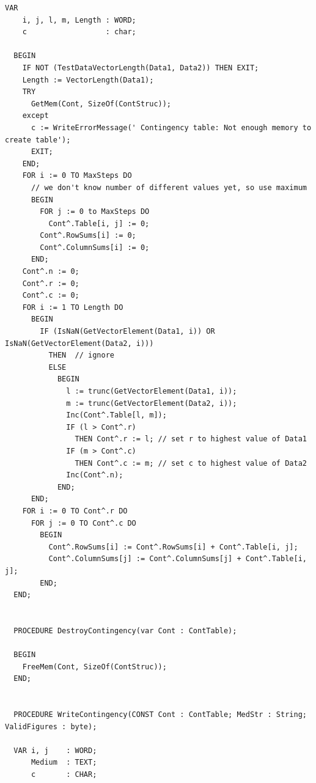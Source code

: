 \begin{refsection}
\begin{lstlisting}[caption=Handling of contingency tables]
  VAR
    i, j, l, m, Length : WORD;
    c                  : char;

  BEGIN
    IF NOT (TestDataVectorLength(Data1, Data2)) THEN EXIT;
    Length := VectorLength(Data1);
    TRY
      GetMem(Cont, SizeOf(ContStruc));
    except
      c := WriteErrorMessage(' Contingency table: Not enough memory to create table');
      EXIT;
    END;
    FOR i := 0 TO MaxSteps DO
      // we don't know number of different values yet, so use maximum
      BEGIN
        FOR j := 0 to MaxSteps DO
          Cont^.Table[i, j] := 0;
        Cont^.RowSums[i] := 0;
        Cont^.ColumnSums[i] := 0;
      END;
    Cont^.n := 0;
    Cont^.r := 0;
    Cont^.c := 0;
    FOR i := 1 TO Length DO
      BEGIN
        IF (IsNaN(GetVectorElement(Data1, i)) OR IsNaN(GetVectorElement(Data2, i)))
          THEN  // ignore
          ELSE
            BEGIN
              l := trunc(GetVectorElement(Data1, i));
              m := trunc(GetVectorElement(Data2, i));
              Inc(Cont^.Table[l, m]);
              IF (l > Cont^.r)
                THEN Cont^.r := l; // set r to highest value of Data1
              IF (m > Cont^.c)
                THEN Cont^.c := m; // set c to highest value of Data2
              Inc(Cont^.n);
            END;
      END;
    FOR i := 0 TO Cont^.r DO
      FOR j := 0 TO Cont^.c DO
        BEGIN
          Cont^.RowSums[i] := Cont^.RowSums[i] + Cont^.Table[i, j];
          Cont^.ColumnSums[j] := Cont^.ColumnSums[j] + Cont^.Table[i, j];
        END;
  END;


  PROCEDURE DestroyContingency(var Cont : ContTable);

  BEGIN
    FreeMem(Cont, SizeOf(ContStruc));
  END;


  PROCEDURE WriteContingency(CONST Cont : ContTable; MedStr : String; ValidFigures : byte);

  VAR i, j    : WORD;
      Medium  : TEXT;
      c       : CHAR;


\end{lstlisting}
\end{refsection}
